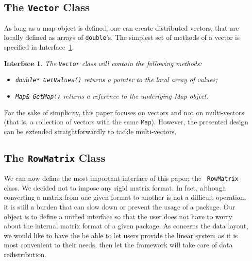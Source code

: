 \documentclass[acmtocl]{acmtrans2m}
\newtheorem{interface}{Interface}[section]
\begin{document}
\subsection{The {\tt Vector} Class}

As long as a map object is defined, one can create distributed vectors, that
are locally defined as arrays of {\tt double}'s. The simplest set of methods
of a vector is specified in Interface~\ref{int:vector}.

\begin{interface}
\label{int:vector}
The {\tt Vector} class will contain the following methods:

\begin{itemize}
\item {\tt double* GetValues()} returns a pointer to the local array of values;
\item {\tt Map\& GetMap()} returns a reference to the underlying Map object.
\end{itemize}
\end{interface}

For the sake of simplicity, this paper focuses on vectors and not on
multi-vectors (that is, a collection of vectors with the same {\tt Map}).
However, the presented design can be extended straightforwardly to tackle
multi-vectors.

\subsection{The {\tt RowMatrix} Class}

We can now define the most important interface of this paper: the {\tt
  RowMatrix} class. We decided not to impose any rigid matrix format.
In fact, although converting a matrix from
one given format to another is not a difficult operation, it is still a burden
that can slow down or prevent the usage of a package. Our object is to define
a unified interface so that the user does not have to worry about the internal
matrix format of a given package. As concerns the
data layout, we would like to have the be able to let users provide the linear
system as it is most convenient to their needs, then let the framework will
take care of data redistribution.  
\end{document}
